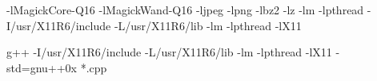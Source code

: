 -lMagickCore-Q16 -lMagickWand-Q16 -ljpeg -lpng -lbz2 -lz -lm -lpthread 
-I/usr/X11R6/include -L/usr/X11R6/lib -lm -lpthread -lX11

g++ -I/usr/X11R6/include -L/usr/X11R6/lib -lm -lpthread -lX11 -std=gnu++0x *.cpp